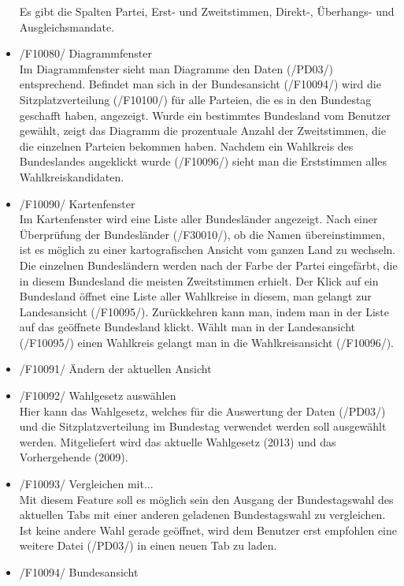 \documentclass[10pt,a4paper]{article}
\begin{document}
\begin{itemize}
	Es gibt die Spalten Partei, Erst- und Zweitstimmen, Direkt-, Überhangs- und Ausgleichsmandate. \hfill \\
	\item /F10080/ Diagrammfenster \hfill \\
	Im Diagrammfenster sieht man Diagramme den Daten (/PD03/) entsprechend. Befindet man sich in der Bundesansicht (/F10094/) wird die Sitzplatzverteilung (/F10100/) für alle Parteien, die es in den Bundestag geschafft haben, angezeigt. Wurde ein bestimmtes Bundesland vom Benutzer gewählt, zeigt das Diagramm die prozentuale Anzahl der Zweitstimmen, die die einzelnen Parteien bekommen haben. Nachdem ein Wahlkreis des Bundeslandes angeklickt wurde (/F10096/) sieht man die Erststimmen alles Wahlkreiskandidaten.
	\item /F10090/ Kartenfenster \hfill \\
	Im Kartenfenster wird eine Liste aller Bundesländer angezeigt. Nach einer Überprüfung der Bundesländer (/F30010/), ob die Namen übereinstimmen, ist es möglich zu einer kartografischen Ansicht vom ganzen Land zu wechseln. Die einzelnen Bundesländern werden nach der Farbe der Partei eingefärbt, die in diesem Bundesland die meisten Zweitstimmen erhielt. Der Klick auf ein Bundesland öffnet eine Liste aller Wahlkreise in diesem, man gelangt zur Landesansicht (/F10095/). Zurückkehren kann man, indem man in der Liste auf das geöffnete Bundesland klickt. Wählt man in der Landesansicht (/F10095/) einen Wahlkreis gelangt man in die Wahlkreisansicht (/F10096/). \\
	\item /F10091/ Ändern der aktuellen Ansicht \hfill \\
	\item /F10092/ Wahlgesetz auswählen \hfill \\
	Hier kann das Wahlgesetz, welches für die Auswertung der Daten (/PD03/) und die Sitzplatzverteilung im Bundestag verwendet werden soll ausgewählt werden. Mitgeliefert wird das aktuelle Wahlgesetz (2013) und das Vorhergehende (2009).
	\item /F10093/ Vergleichen mit... \hfill \\
	Mit diesem Feature soll es möglich sein den Ausgang der Bundestagswahl des aktuellen Tabs mit einer anderen geladenen Bundestagswahl zu vergleichen. Ist keine andere Wahl gerade geöffnet, wird dem Benutzer erst empfohlen eine weitere Datei (/PD03/) in einen neuen Tab zu laden.
	\item /F10094/ Bundesansicht \hfill \\

\end{itemize}
\end{document}
